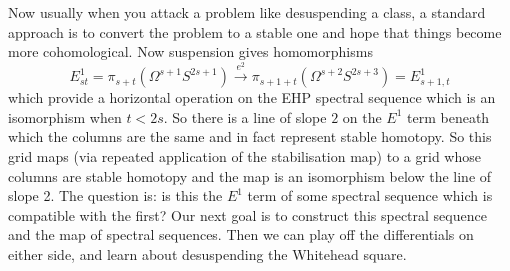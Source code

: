 Now usually when you attack a problem like desuspending a class, a standard approach is to convert the problem to a stable one and hope that things become more cohomological.  Now suspension gives homomorphisms
\[E_{st}^1=\pi_{s+t}(\Omega^{s+1}S^{2s+1})\overset{e^2}{\longrightarrow}\pi_{s+1+t}(\Omega^{s+2}S^{2s+3})=E_{s+1,t}^1\]
which provide a horizontal operation on the EHP spectral sequence which is an isomorphism when $t<2s$.  So there is a line of slope $2$ on the $E^1$ term beneath which the columns are the same and in fact represent stable homotopy.  So this grid maps (via repeated application of the stabilisation map) to a grid whose columns are stable homotopy and the map is an isomorphism below the line of slope 2.  The question is: is this the $E^1$ term of some spectral sequence which is compatible with the first?  Our next goal is to construct this spectral sequence and the map of spectral sequences.  Then we can play off the differentials on either side, and learn about desuspending the Whitehead square.


\fi
\BoxedNote{}
